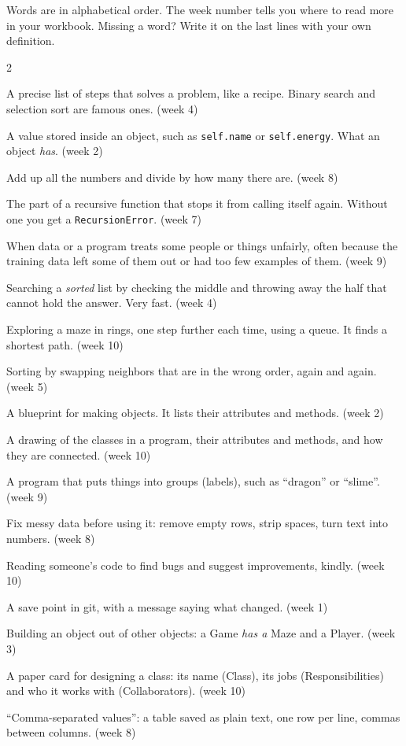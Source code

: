 \documentclass[level=3]{kidscode}
\newcommand{\term}[3]{\item[#1] #2 \textcolor{kcgray}{\small(week #3)}}
\begin{document}

\begin{tip}
Words are in alphabetical order. The week number tells you where to read more in your workbook.
Missing a word? Write it on the last lines with your own definition.
\end{tip}

\begin{multicols}{2}
\begin{description}[leftmargin=0pt,itemsep=3pt,font=\bfseries]
\term{algorithm}{A precise list of steps that solves a problem, like a recipe. Binary search and
selection sort are famous ones.}{4}
\term{attribute}{A value stored inside an object, such as \texttt{self.name} or
\texttt{self.energy}. What an object \emph{has}.}{2}
\term{average (mean)}{Add up all the numbers and divide by how many there are.}{8}
\term{base case}{The part of a recursive function that stops it from calling itself again.
Without one you get a \texttt{RecursionError}.}{7}
\term{bias}{When data or a program treats some people or things unfairly, often because the
training data left some of them out or had too few examples of them.}{9}
\term{binary search}{Searching a \emph{sorted} list by checking the middle and throwing away the
half that cannot hold the answer. Very fast.}{4}
\term{breadth-first search (BFS)}{Exploring a maze in rings, one step further each time, using a
queue. It finds a shortest path.}{10}
\term{bubble sort}{Sorting by swapping neighbors that are in the wrong order, again and again.}{5}
\term{class}{A blueprint for making objects. It lists their attributes and methods.}{2}
\term{class diagram}{A drawing of the classes in a program, their attributes and methods, and how
they are connected.}{10}
\term{classifier}{A program that puts things into groups (labels), such as \enquote{dragon} or
\enquote{slime}.}{9}
\term{clean (data)}{Fix messy data before using it: remove empty rows, strip spaces, turn text
into numbers.}{8}
\term{code review}{Reading someone's code to find bugs and suggest improvements, kindly.}{10}
\term{commit}{A save point in git, with a message saying what changed.}{1}
\term{composition}{Building an object out of other objects: a Game \emph{has a} Maze and a
Player.}{3}
\term{CRC card}{A paper card for designing a class: its name (Class), its jobs
(Responsibilities) and who it works with (Collaborators).}{10}
\term{CSV}{\enquote{Comma-separated values}: a table saved as plain text, one row per line, commas
between columns.}{8}

\end{description}
\end{multicols}
\end{document}
